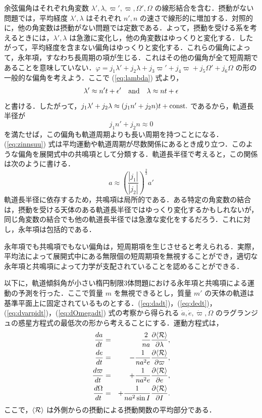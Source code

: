 \documentclass[11pt,a4paper,oneside,onecolumn]{jarticle}
\begin{document}
余弦偏角はそれぞれ角変数 $\lambda', \lambda, \varpi', \varpi, \Omega', \Omega$ の線形結合を含む．摂動がない問題では，平均経度 $\lambda', \lambda$ はそれぞれ $n', n$ の速さで線形的に増加する．対照的に，他の角変数は摂動がない問題では定数である．よって，摂動を受ける系を考えるときには，$\lambda', \lambda$ は急激に変化し，他の角変数はゆっくりと変化する．したがって，平均経度を含まない偏角はゆっくりと変化する．これらの偏角によって，永年項，すなわち長周期の項が生じる．これはその他の偏角が全て短周期であることを意味していない．$\varphi = j_1 \lambda' + j_2 \lambda + j_3 \varpi' + j_4 \varpi + j_5 \Omega' + j_6 \Omega$ の形の一般的な偏角を考えよう．ここで (\ref{eq:lambda}) 式より，
\begin{equation}
\lambda' \approx n' t + \epsilon' \quad {\rm and} \quad \lambda \approx n t + \epsilon
\end{equation}
と書ける．したがって，$j_1 \lambda' + j_2 \lambda \approx (j_1 n' + j_2 n) t + {\rm const.}$ であるから，軌道長半径が
\begin{equation}
j_1 n' + j_2 n \approx 0 \label{eq:zinnsuu}
\end{equation}
を満たせば，この偏角も軌道周期よりも長い周期を持つことになる．(\ref{eq:zinnsuu}) 式は平均運動や軌道周期が尽数関係にあるとき成り立つ．このような偏角を展開式中の共鳴項として分類する．軌道長半径で考えると，この関係は次のように書ける．
\begin{equation}
a \approx \left( \frac{|j_1|}{|j_2|} \right)^{\frac{2}{3}} a'
\end{equation}
軌道長半径に依存するため，共鳴項は局所的である．ある特定の角変数の結合は，摂動を受ける天体のある軌道長半径ではゆっくり変化するかもしれないが，同じ角変数の結合でも他の軌道長半径では急激な変化をするだろう．これに対し，永年項は包括的である．

永年項でも共鳴項でもない偏角は，短周期項を生じさせると考えられる．実際，平均法によって展開式中にある無限個の短周期項を無視することができ，適切な永年項と共鳴項によって力学が支配されていることを認めることができる．

以下に，軌道傾斜角が小さい楕円制限3体問題における永年項と共鳴項による運動の予測を行った．ここで質量 $m$ を無視できるとし，質量 $m'$ の天体の軌道は基準平面上に固定されているものとする．(\ref{eq:dadt})，(\ref{eq:dedt})，(\ref{eq:dvarpidt})，(\ref{eq:dOmegadt}) 式の考察から得られる $\dot{a}, \dot{e}, \dot{\varpi}, \dot{\Omega}$ のラグランジュの惑星方程式の最低次の形から考えることにする．運動方程式は，
\begin{eqnarray}
\frac{d a}{d t} & = & \frac{2}{n a} \frac{\partial \langle {\cal R} \rangle}{\partial \lambda}, \label{eq:dadt2} \\
\frac{d e}{d t} & = & - \frac{1}{n a^2 e} \frac{\partial \langle {\cal R} \rangle}{\partial \varpi}, \label{eq:dedt2} \\
\frac{d \varpi}{d t} & = & + \frac{1}{n a^2 e} \frac{\partial \langle {\cal R} \rangle}{\partial e}, \label{eq:dvarpidt2} \\
\frac{d \Omega}{d t} & = & + \frac{1}{n a^2 \sin I} \frac{\partial \langle {\cal R} \rangle}{\partial I}.\label{eq:dOmegadt2}
\end{eqnarray}
ここで，$\langle {\cal R} \rangle$ は外側からの摂動による摂動関数の平均部分である．
\end{document}
